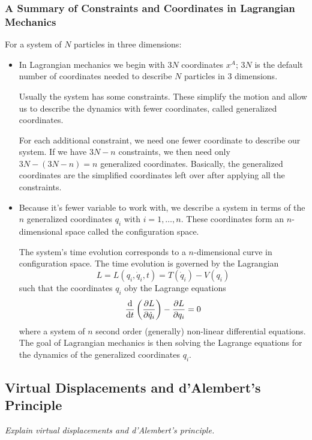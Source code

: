 \documentclass[11pt, a4paper]{article}
\begin{document}
\subsubsection{A Summary of Constraints and Coordinates in Lagrangian Mechanics}
For a system of $ N $ particles in three dimensions:
\begin{itemize}
	\item In Lagrangian mechanics we begin with $ 3N $ coordinates $ x^{A} $; $ 3N $ is the default number of coordinates needed to describe $ N$ particles in 3 dimensions. 
	
	Usually the system has some constraints. These simplify the motion and allow us to describe the dynamics with fewer coordinates, called generalized coordinates.
	
	For each additional constraint, we need one fewer coordinate to describe our system. If we have $ 3N - n $ constraints, we then need only $ 3N - (3N - n) = n $ generalized coordinates. Basically, the generalized coordinates are the simplified coordinates left over after applying all the constraints.
	
	\item Because it's fewer variable to work with, we describe a system in terms of the $ n $ generalized coordinates $ q_i $ with $ i = 1, \ldots, n $. These coordinates form an $ n $-dimensional space called the configuration space. 
	
	The system's time evolution corresponds to a $ n $-dimensional curve in configuration space. The time evolution is governed by the Lagrangian 
	\begin{equation*}
		L = L(q_i, \dot{q}_i, t) = T(\dot{q}_i) - V(q_i)
	\end{equation*}
	such that the coordinates $ q_{i} $ oby the Lagrange equations
	\begin{equation*}
		\dv{}{t}\left(\pdv{L}{\dot{q}_i}\right) - \pdv{L}{q_i} = 0
	\end{equation*}
	where a system of $ n $ second order (generally) non-linear differential equations. The goal of Lagrangian mechanics is then solving the Lagrange equations for the dynamics of the generalized coordinates $ q_{i} $.
	
\end{itemize}

\subsection{Virtual Displacements and d'Alembert's Principle}
\textit{Explain virtual displacements and d'Alembert's principle. }
\end{document}
